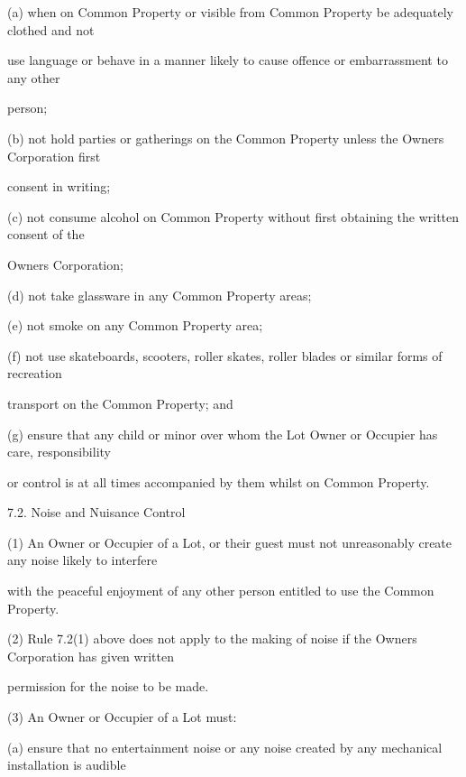 \documentclass{article}
\begin{document}
{\fontsize{9.962}{1}(a) when on Common Property or visible from Common Property be adequately clothed and not }

{\fontsize{10.02}{1}use language or behave in a manner likely to cause offence or embarrassment to any other }

{\fontsize{10.02}{1}person; }

\newpage

{\fontsize{9.962}{1}(b) not hold parties or gatherings on the Common Property unless the Owners Corporation first }

{\fontsize{10.02}{1}consent in writing; }

{\fontsize{9.962}{1}(c) not consume alcohol on Common Property without first obtaining the written consent of the }

{\fontsize{10.02}{1}Owners Corporation; }

{\fontsize{9.962}{1}(d) not take glassware in any Common Property areas; }

{\fontsize{9.962}{1}(e) not smoke on any Common Property area; }

{\fontsize{9.962}{1}(f) not use skateboards, scooters, roller skates, roller blades or similar forms of recreation }

{\fontsize{10.02}{1}transport on the Common Property; and }

{\fontsize{9.962}{1}(g) ensure that any child or minor over whom the Lot Owner or Occupier has care, responsibility }

{\fontsize{10.02}{1}or control is at all times accompanied by them whilst on Common Property. }

{\fontsize{9.99}{1}7.2. Noise and Nuisance Control }

{\fontsize{9.962}{1}(1) An Owner or Occupier of a Lot, or their guest must not unreasonably create any noise likely to interfere }

{\fontsize{10.02}{1}with the peaceful enjoyment of any other person entitled to use the Common Property. }

{\fontsize{9.962}{1}(2) Rule 7.2(1) above does not apply to the making of noise if the Owners Corporation has given written }

{\fontsize{10.02}{1}permission for the noise to be made. }

{\fontsize{9.962}{1}(3) An Owner or Occupier of a Lot must: }

{\fontsize{9.962}{1}(a) ensure that no entertainment noise or any noise created by any mechanical installation is audible }
\end{document}
